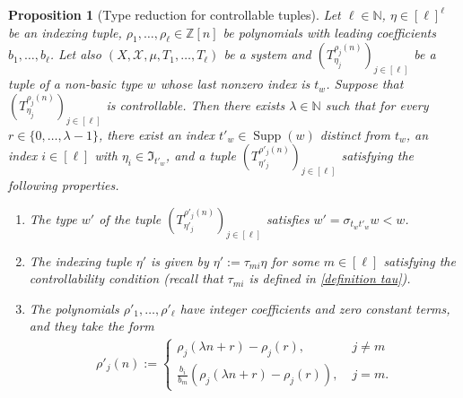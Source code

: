 \documentclass[11pt]{amsart}
\newtheorem{proposition}[lemma]{Proposition}
\theoremstyle{definition}
\newcommand{\N}{{\mathbb N}}
\newcommand{\Z}{{\mathbb Z}}
\newcommand{\CX}{{\mathcal X}}
\newcommand{\FI}{{\mathfrak I}}
\DeclareMathOperator{\supp}{Supp}
\newcommand{\brac}[1]{\mathopen{}\left( #1 \mathclose{}\right)}
\begin{document}
\begin{proposition}[Type reduction for controllable tuples]\label{P: type reduction}
Let $\ell\in\N$, $\eta\in[\ell]^\ell$ be an indexing tuple, $\rho_1, \ldots, \rho_\ell\in\Z[n]$ be polynomials with leading coefficients $b_1, \ldots, b_\ell$. Let also  $(X, \CX, \mu, T_1, \ldots, T_\ell)$ be a system and $\brac{T_{\eta_j}^{\rho_j(n)}}_{j\in[\ell]}$ be a tuple of a non-basic type $w$ whose last nonzero index is $t_w$. Suppose that $\brac{T_{\eta_j}^{\rho_j(n)}}_{j\in[\ell]}$ is controllable.
 Then there exists $\lambda\in\N$ such that for every $r\in\{0, \ldots, \lambda-1\}$, there exist an index $t'_w\in\supp(w)$ distinct from $t_w$, an index $i\in[\ell]$ with $\eta_i\in\FI_{t'_w}$, and a tuple $\brac{T_{\eta'_j}^{\rho'_j(n)}}_{j\in[\ell]}$ satisfying the following properties.
\begin{enumerate}
    \item The type $w'$ of the tuple $\brac{T_{\eta'_j}^{\rho'_j(n)}}_{j\in[\ell]}$ satisfies $w' = \sigma_{t_w t'_w}w < w$.
    \item The indexing tuple $\eta'$ is given by $\eta' := \tau_{m i} \eta$ for some $m\in[\ell]$ satisfying the controllability condition (recall that $\tau_{mi}$ is defined in \eqref{definition tau}).
    \item The polynomials $\rho'_{1}, \ldots, \rho'_{\ell}$ have integer coefficients and zero constant terms, and they take the form
\begin{align*}
    \rho'_{j}(n) := \begin{cases} \rho_{j}(\lambda n + r) - \rho_{j}(r),\; &j\neq m\\ \frac{b_{i}}{b_{m}}(\rho_j(\lambda n + r) - \rho_j(r)),\; &j= m. \end{cases}
\end{align*}
\end{enumerate}


\end{proposition}
\end{document}
